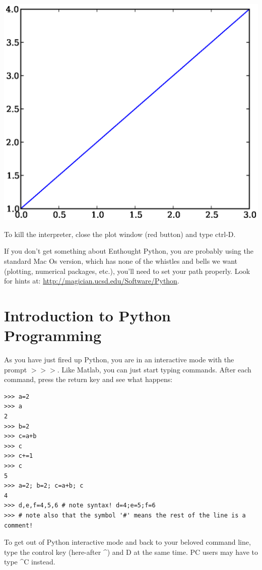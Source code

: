 \documentclass[11pt]{book}
\begin{document}
  \includegraphics[width=12 cm]{EPSfiles/matplotlib.eps}


To kill the interpreter, close the plot window (red button) and type ctrl-D.  


If you don't get something about Enthought Python, you are probably using the standard Mac Os version, which has none of the whistles and bells we want (plotting, numerical packages, etc.), you'll need to set your path properly. Look for hints at:
\url{http://magician.ucsd.edu/Software/Python}.    


\section{Introduction to Python Programming}



As you have just fired up Python, you are in an interactive mode with the prompt  {\color{blue}$>>>$}.  Like Matlab, you can just start typing commands. After each command, press the return key and see what happens:

{ \color{blue} \begin{verbatim}
>>> a=2 
>>> a
2
>>> b=2
>>> c=a+b
>>> c
>>> c+=1
>>> c
5
>>> a=2; b=2; c=a+b; c
4
>>> d,e,f=4,5,6 # note syntax! d=4;e=5;f=6
>>> # note also that the symbol '#' means the rest of the line is a comment!
\end{verbatim}}

To get out of Python interactive mode and back to your beloved command line, type the control key (here-after  {\color{blue}\^{ }}) and  {\color{blue}D} at the same time.  PC users may have to type {\color{blue} \^{ }C} instead. 
\end{document}
